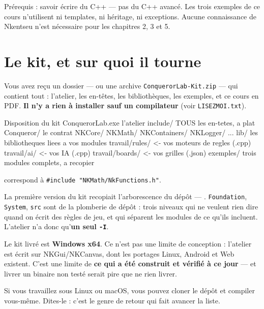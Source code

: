 Prérequis : savoir écrire du C++ — pas du C++ avancé. Les trois exemples de ce
cours n'utilisent ni templates, ni héritage, ni exceptions. Aucune connaissance
de Nkentseu n'est nécessaire pour les chapitres 2, 3 et 5.

\section{Le kit, et sur quoi il tourne}

Vous avez reçu un dossier — ou une archive \texttt{ConquerorLab-Kit.zip} — qui
contient tout : l'atelier, les en-têtes, les bibliothèques, les exemples, et ce
cours en PDF. \textbf{Il n'y a rien à installer sauf un compilateur} (voir
\texttt{LISEZMOI.txt}).

\begin{nkcode}{Disposition du kit}
ConquerorLab.exe          l'atelier
include/                  TOUS les en-tetes, a plat
    Conqueror/            le contrat
    NKCore/  NKMath/  NKContainers/  NKLogger/  ...
lib/                      les bibliotheques liees a vos modules
travail/rules/            <- vos moteurs de regles    (.cpp)
travail/ai/               <- vos IA                   (.cpp)
travail/boards/           <- vos grilles              (.json)
exemples/                 trois modules complets, a recopier
\end{nkcode}

\begin{nkretenir}
 correspond à
\texttt{\#include "NKMath/NkFunctions.h"}.

La première version du kit recopiait l'arborescence du dépôt —
. \texttt{Foundation},
\texttt{System}, \texttt{src} sont de la plomberie de dépôt : trois niveaux qui
ne veulent rien dire quand on écrit des règles de jeu, et qui séparent les
modules de ce qu'ils incluent. L'atelier n'a donc qu'\textbf{un seul \texttt{-I}}.
\end{nkretenir}

\begin{nkpiege}
Le kit livré est \textbf{Windows x64}. Ce n'est pas une limite de conception :
l'atelier est écrit sur NKGui/NKCanvas, dont les portages Linux, Android et Web
existent. C'est une limite de \textbf{ce qui a été construit et vérifié à ce
jour} — et livrer un binaire non testé serait pire que ne rien livrer.

Si vous travaillez sous Linux ou macOS, vous pouvez cloner le dépôt et compiler
vous-même. Dites-le : c'est le genre de retour qui fait avancer la liste.
\end{nkpiege}

